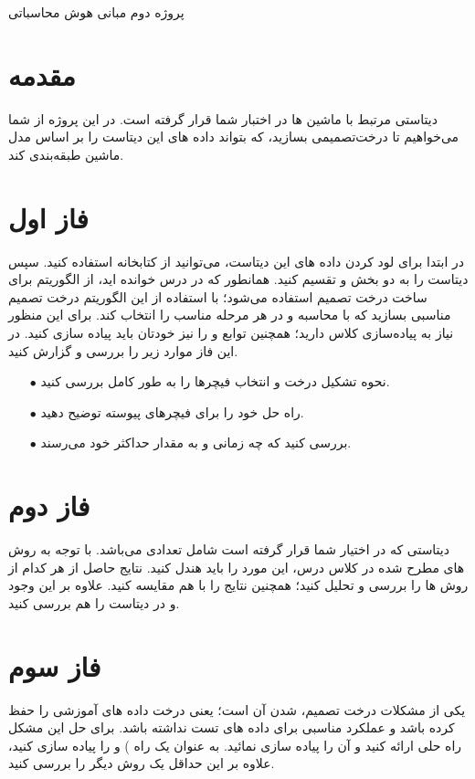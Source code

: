 \documentclass{article}
\begin{document}
	\begin{centering}
		\LARGE
		پروژه دوم مبانی هوش محاسباتی \\
	\end{centering}
	\section*{مقدمه}
	دیتاستی مرتبط با ماشین ها در اختبار شما قرار گرفته است. در این پروژه از شما   می‌خواهیم تا درخت‌تصمیمی بسازید، که بتواند داده های این دیتاست را بر اساس مدل ماشین طبقه‌بندی کند.
	\\

	
	\section{فاز اول}
	در ابتدا برای لود کردن داده های این دیتاست، می‌توانید از کتابخانه  استفاده کنید. سپس دیتاست را به دو بخش  و  تقسیم کنید.
	همانطور که در درس خوانده اید، از الگوریتم  برای ساخت درخت تصمیم استفاده می‌شود؛ با استفاده از این الگوریتم درخت تصمیم مناسبی بسازید که با محاسبه  و  در هر مرحله  مناسب را انتخاب کند. برای این منظور نیاز به پیاده‌سازی کلاس  دارید؛ همچنین توابع   و  را نیز خودتان باید پیاده سازی کنید. در این فاز موارد زیر را بررسی و گزارش کنید.
	\begin{itemize}
		\item [$\bullet$] نحوه تشکیل درخت و انتخاب فیچرها را به طور کامل بررسی کنید.
		\item [$\bullet$] راه حل خود را برای فیچرهای پیوسته توضیح دهید.
		\item [$\bullet$] بررسی کنید که چه زمانی  و  به مقدار حداکثر خود می‌رسند.
	\end{itemize}
	
	\section {فاز دوم}
	دیتاستی که در اختیار شما قرار گرفته است شامل تعدادی  می‌باشد. با توجه به روش های مطرح شده در کلاس درس، این مورد را باید هندل کنید. نتایج حاصل از هر کدام از روش ها را بررسی و تحلیل کنید؛ همچنین نتایج را با هم مقایسه کنید. علاوه بر این وجود  و  در دیتاست را هم بررسی کنید. 
	\section{فاز سوم}
		یکی از مشکلات درخت تصمیم،  شدن آن است؛ یعنی درخت داده های آموزشی را حفظ کرده باشد و عملکرد مناسبی برای داده های تست نداشته باشد. برای حل این مشکل راه حلی ارائه کنید و آن را پیاده سازی نمائید. به عنوان یک راه ) و  را پیاده سازی کنید، علاوه بر این حداقل یک روش دیگر را بررسی کنید.
\end{document}
